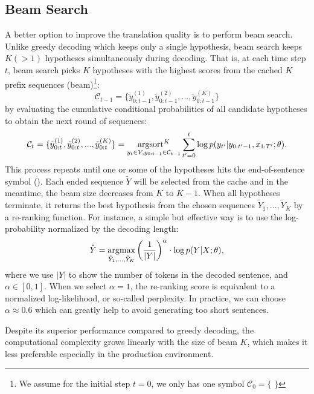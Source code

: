 \subsection{Beam Search}  
\label{cp2.sec.bs}
A better option to improve the translation quality is to perform beam search.
Unlike greedy decoding which keeps only a single hypothesis, beam search keeps $K (>1)$ hypotheses simultaneously during decoding. 
That is, at each time step $t$, beam search picks $K$ hypotheses with the highest scores from the cached $K$ prefix sequences (beam)\footnote{We assume for the initial step $t=0$, we only has one symbol $\mathcal{C}_0 = \{$ \bos $\}$}:
\begin{equation}
    \mathcal{C}_{t-1} = \{\tilde{y}_{0:t-1}^{(1)}, \tilde{y}_{0:t-1}^{(2)}, ..., \tilde{y}_{0:t-1}^{(K)} \}
\end{equation}
by evaluating the cumulative conditional probabilities of all candidate hypotheses to obtain the next round of sequences: 
\begin{equation}
     \mathcal{C}_{t} = \{\tilde{y}_{0:t}^{(1)}, \tilde{y}_{0:t}^{(2)}, ..., \tilde{y}_{0:t}^{(K)} \} =
     \mathop{\operatorname{\text{argsort}}^K}\limits_{y_t\in V, \\  y_{0:t-1}\in \mathcal{C}_{t-1}} \sum_{t'=0}^t\log p(y_{t'}|y_{0:t'-1}, x_{1:T'}; \theta).
\end{equation}
This process repeats until one or some of the hypotheses hits the end-of-sentence symbol (\eos). Each ended sequence $\tilde{Y}$ will be selected from the cache and in the meantime, the beam size decreases from $K$ to  $K - 1$.
When all hypotheses terminate, it returns the best hypothesis from the chosen sequences $\tilde{Y}_1, ..., \tilde{Y}_K$ by a re-ranking function. For instance, a simple but effective way is to use the log-probability normalized by the decoding length:
\begin{equation}
    \hat{Y} = \mathop{\text{argmax}}_{\tilde{Y}_1, ..., \tilde{Y}_K} \left(\frac{1}{|Y|}\right)^\alpha\cdot\log p(Y|X; \theta),
\end{equation}
where we use $|Y|$ to show the number of tokens in the decoded sentence, and $\alpha \in [0, 1]$. When we select $\alpha=1$, the re-ranking score is equivalent to a normalized log-likelihood, or so-called perplexity. In practice, we can choose $\alpha \approx 0.6$ which can greatly help to avoid generating too short sentences.

Despite its superior performance compared to greedy decoding, the computational complexity grows linearly with the size of beam $K$, which makes it less preferable especially in the production environment.

